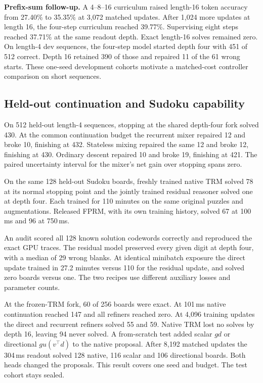 \documentclass[11pt,a4paper]{article}
\newcommand{\newtopic}{\clearpage}
\begin{document}
\textbf{Prefix-sum follow-up.} A 4--8--16 curriculum raised length-16 token accuracy from 27.40\% to 35.35\% at 3,072 matched updates. After 1,024 more updates at length 16, the four-step curriculum reached 39.77\%. Supervising eight steps reached 37.71\% at the same readout depth. Exact length-16 solves remained zero. On length-4 dev sequences, the four-step model started depth four with 451 of 512 correct. Depth 16 retained 390 of those and repaired 11 of the 61 wrong starts. These one-seed development cohorts motivate a matched-cost controller comparison on short sequences.

\newtopic
\subsection{Held-out continuation and Sudoku capability}
On 512 held-out length-4 sequences, stopping at the shared depth-four fork solved 430. At the common continuation budget the recurrent mixer repaired 12 and broke 10, finishing at 432. Stateless mixing repaired the same 12 and broke 12, finishing at 430. Ordinary descent repaired 10 and broke 19, finishing at 421. The paired uncertainty interval for the mixer's net gain over stopping spans zero.

On the same 128 held-out Sudoku boards, freshly trained native TRM solved 78 at its normal stopping point and the jointly trained residual reasoner solved one at depth four. Each trained for 110 minutes on the same original puzzles and augmentations. Released FPRM, with its own training history, solved 67 at 100\,ms and 96 at 750\,ms.

An audit scored all 128 known solution codewords correctly and reproduced the exact GPU traces. The residual model preserved every given digit at depth four, with a median of 29 wrong blanks. At identical minibatch exposure the direct update trained in 27.2 minutes versus 110 for the residual update, and solved zero boards versus one. The two recipes use different auxiliary losses and parameter counts.

At the frozen-TRM fork, 60 of 256 boards were exact. At 101\,ms native continuation reached 147 and all refiners reached zero. At 4,096 training updates the direct and recurrent refiners solved 55 and 59. Native TRM lost no solves by depth 16, leaving 94 never solved. A from-scratch test added scalar $gd$ or directional $gu(v^\top d)$ to the native proposal. After 8,192 matched updates the 304\,ms readout solved 128 native, 116 scalar and 106 directional boards. Both heads changed the proposals. This result covers one seed and budget. The test cohort stays sealed.
\end{document}
